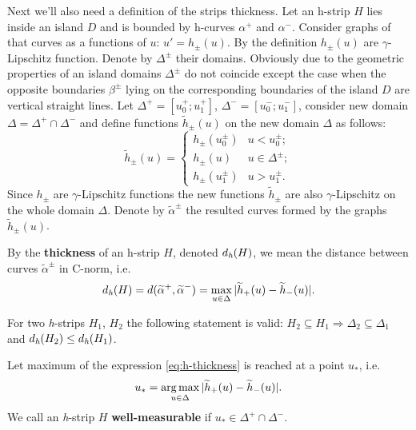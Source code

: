 Next we'll also need a definition of the strips thickness.
Let an h-strip $H$ lies inside an island $D$ and is bounded by h-curves $\alpha^+$ and $\alpha^-$.
Consider graphs of that curves as a functions of $u$: $u' = h_{\pm}(u)$.
By the definition $h_{\pm}(u)$ are $\gamma$-Lipschitz function.
Denote by $\Delta^{\pm}$ their domains.
Obviously due to the geometric properties of an island domains $\Delta^{\pm}$ do not coincide except the case when the opposite boundaries $\beta^{\pm}$ lying on the corresponding boundaries of the island $D$ are vertical straight lines.
Let $\Delta^+ = [u_0^+; u_1^+]$, $\Delta^- = [u_0^-; u_1^-]$, consider new domain $\Delta = \Delta^+ \cap \Delta^-$ and define functions $\widetilde{h}_{\pm}(u)$ on the new domain $\Delta$ as follows:
\begin{equation}
	\widetilde{h}_{\pm}(u) = \begin{cases}
		h_{\pm}(u_0^{\pm}) & u < u_0^{\pm}; \\
		h_{\pm}(u) & u \in \Delta^{\pm}; \\
		h_{\pm}(u_1^{\pm}) & u > u_1^{\pm}.
	\end{cases}
\label{eq:continuation}
\end{equation}
Since $h_{\pm}$ are $\gamma$-Lipschitz functions the new functions $\widetilde{h}_{\pm}$ are also $\gamma$-Lipschitz on the whole domain $\Delta$.
Denote by $\widetilde{\alpha}^{\pm}$ the resulted curves formed by the graphs $\widetilde{h}_{\pm}(u)$.

\begin{definition}
\label{def:h-thickness}
	By the {\bf thickness} of an h-strip $H$, denoted $d_\emph{h}(H)$, we mean the distance between curves $\widetilde{\alpha}^{\pm}$ in C-norm, i.e.
	\begin{equation}
		d_\emph{h}(H) = d(\widetilde{\alpha}^+, \widetilde{\alpha}^-) = \max \limits_{u \in \Delta} |\widetilde{h}_+(u) - \widetilde{h}_-(u)|.
	\label{eq:h-thickness}
	\end{equation}
\end{definition}

\begin{remark}
	For two \emph{h}-strips $H_1$, $H_2$ the following statement is valid: $H_2 \subseteq H_1 \Rightarrow \Delta_2 \subseteq \Delta_1$ and $d_\emph{h}(H_2) \le d_\emph{h}(H_1)$.
\end{remark}

\begin{definition}
	Let maximum of the expression \eqref{eq:h-thickness} is reached at a point $u_*$, i.e.
	\begin{equation}
		u_* = \operatorname*{arg\,max} \limits_{u \in \Delta} |\widetilde{h}_+(u) - \widetilde{h}_-(u)|.
	\label{eq:argmax}
	\end{equation}
	We call an \emph{h}-strip $H$ {\bf well-measurable} if $u_* \in \Delta^+ \cap \Delta^-$.
\label{def:well-measurable-h-strip}
\end{definition}

